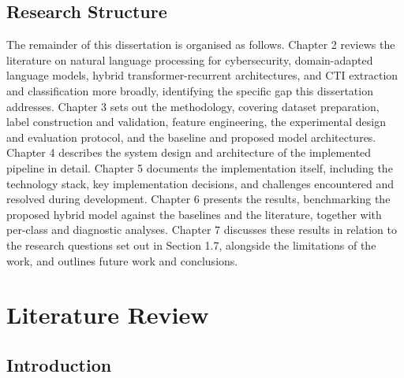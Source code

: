 \documentclass[12pt,a4paper]{report}
\begin{document}
\protect{}\label{_Toc239502932}{}\section{Research
Structure}

The remainder of this dissertation is organised as follows. Chapter 2
reviews the literature on natural language processing for cybersecurity,
domain-adapted language models, hybrid transformer-recurrent
architectures, and CTI extraction and classification more broadly,
identifying the specific gap this dissertation addresses. Chapter 3 sets
out the methodology, covering dataset preparation, label construction
and validation, feature engineering, the experimental design and
evaluation protocol, and the baseline and proposed model architectures.
Chapter 4 describes the system design and architecture of the
implemented pipeline in detail. Chapter 5 documents the implementation
itself, including the technology stack, key implementation decisions,
and challenges encountered and resolved during development. Chapter 6
presents the results, benchmarking the proposed hybrid model against the
baselines and the literature, together with per-class and diagnostic
analyses. Chapter 7 discusses these results in relation to the research
questions set out in Section 1.7, alongside the limitations of the work,
and outlines future work and conclusions.

\chapter{Literature Review}


\section{Introduction}\label{introduction}
\end{document}
